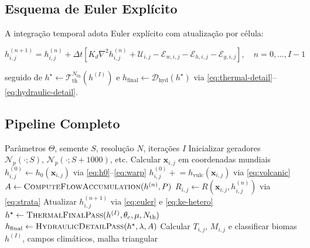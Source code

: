 \documentclass[11pt,a4paper]{article}
\begin{document}
\subsection{Esquema de Euler Explícito}

A integração temporal adota Euler explícito com atualização por célula:

\begin{equation}
  h_{i,j}^{(n+1)} = h_{i,j}^{(n)} + \Delta t \left[
    K_d \nabla^2 h_{i,j}^{(n)}
    + \mathcal{U}_{i,j}
    - \mathcal{E}_{w,i,j}
    - \mathcal{E}_{h,i,j}
    - \mathcal{E}_{g,i,j}
  \right],
  \quad n = 0,\ldots,I-1
  \label{eq:euler}
\end{equation}

seguido de $h^{\star} \gets \mathcal{T}_{\text{th}}^{N_{\text{th}}}(h^{(I)})$ e
$h_{\text{final}} \gets \mathcal{D}_{\text{hyd}}(h^{\star})$ via
\eqref{eq:thermal-detail}--\eqref{eq:hydraulic-detail}.

\subsection{Pipeline Completo}

\begin{algorithm}[H]
\caption{Geração de Terreno Ultra-Realista}
\label{alg:main}
\begin{algorithmic}[1]
\Require Parâmetros $\Theta$, semente $S$, resolução $N$, iterações $I$
\State Inicializar geradores $\mathcal{N}_p(\cdot; S)$, $\mathcal{N}_p(\cdot; S{+}1000)$, etc.
  \State Calcular $\mathbf{x}_{i,j}$ em coordenadas mundiais
  \State $h_{i,j}^{(0)} \gets h_0(\mathbf{x}_{i,j})$ via \eqref{eq:h0}--\eqref{eq:warp}
\EndFor
{}
  \State $h_{i,j}^{(0)} \mathrel{+}= h_{\text{vulc}}(\mathbf{x}_{i,j})$ via \eqref{eq:volcanic}
\EndIf
{}
  \State $A \gets \textsc{ComputeFlowAccumulation}(h^{(n)}, P)$
    \State $R_{i,j} \gets R(\mathbf{x}_{i,j}, h_{i,j}^{(n)})$ via \eqref{eq:strata}
    \State Atualizar $h_{i,j}^{(n+1)}$ via \eqref{eq:euler} e \eqref{eq:ke-hetero}
  \EndFor
\EndFor
\State $h^{\star} \gets \textsc{ThermalFinalPass}(h^{(I)}, \theta_c, \mu, N_{\text{th}})$
\State $h_{\text{final}} \gets \textsc{HydraulicDetailPass}(h^{\star}, \lambda, A)$
\State Calcular $T_{i,j}$, $M_{i,j}$ e classificar biomas
\State \Return $h^{(I)}$, campos climáticos, malha triangular
\end{algorithmic}
\end{algorithm}
\end{document}

